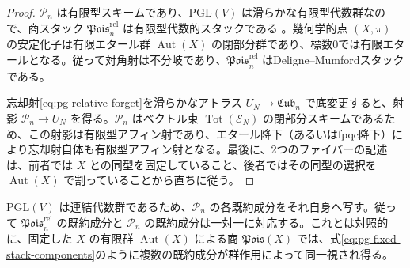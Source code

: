 \begin{proof}
$\mathscr P_n$ は有限型スキームであり、$\mathrm{PGL}(V)$ は滑らかな有限型代数群なので、商スタック $\mathfrak{Pois}^{\mathrm{rel}}_n$ は有限型代数的スタックである \cite[Theorem~97.17.2, Tag~06FI]{PStacks}。幾何学的点 $(X,\pi)$ の安定化子は有限エタール群 $\operatorname{Aut}(X)$ の閉部分群であり、標数0では有限エタールとなる。従って対角射は不分岐であり、$\mathfrak{Pois}^{\mathrm{rel}}_n$ はDeligne--Mumfordスタックである。

忘却射\eqref{eq:pg-relative-forget}を滑らかなアトラス $U_N\to\mathfrak{Cub}_n$ で底変更すると、射影 $\mathscr P_n\to U_N$ を得る。$\mathscr P_n$ はベクトル束 $\operatorname{Tot}(\mathscr E_N)$ の閉部分スキームであるため、この射影は有限型アフィン射であり、エタール降下（あるいはfpqc降下）により忘却射自体も有限型アフィン射となる。最後に、2つのファイバーの記述は、前者では $X$ との同型を固定していること、後者ではその同型の選択を $\operatorname{Aut}(X)$ で割っていることから直ちに従う。
\end{proof}

\begin{remark}\label{rem:pg-stack-component-warning}
$\mathrm{PGL}(V)$ は連結代数群であるため、$\mathscr P_n$ の各既約成分をそれ自身へ写す。従って $\mathfrak{Pois}^{\mathrm{rel}}_n$ の既約成分と $\mathscr P_n$ の既約成分は一対一に対応する。これとは対照的に、固定した $X$ の有限群 $\operatorname{Aut}(X)$ による商 $\mathfrak{Pois}(X)$ では、式\eqref{eq:pg-fixed-stack-components}のように複数の既約成分が群作用によって同一視され得る。
\end{remark}
